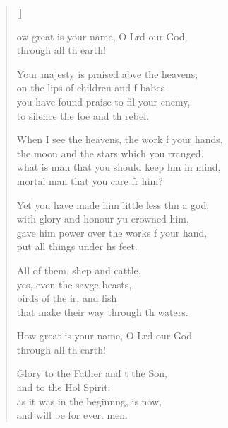 \settowidth{\versewidth}{When I see the heavens, the work of your hands, *}
\begin{verse}[\versewidth]
  \begin{patverse}

ow great is your name, O Lrd our God,\Med\\
through all th earth!

Your majesty is praised abve the heavens;\Med\\
on the lips of children and f babes\\
you have found praise to fil your enemy,\Med\\
to silence the foe and th rebel.

When I see the heavens, the work f your hands,\Med\\
the moon and the stars which you rranged,\\
what is man that you should keep h\pointup{\i}m in mind,\Med\\
mortal man that you care fr him?

Yet you have made him little less thn a god;\Med\\
with glory and honour yu crowned him,\\
gave him power over the works f your hand,\Med\\
put all things under h\pointup{\i}s feet.

All of them, shep and cattle,\Med\\
yes, even the savge beasts,\\
birds of the ir, and fish\Med\\
that make their way through th waters.

How great is your name, O Lrd our God\\
through all th earth!

Glory to the Father and t the Son,\Med\\
and to the Hol Spirit:\\
as it was in the beginn\pointup{\i}ng, is now,\Med\\
and will be for ever. men.
  \end{patverse}
  \end{verse}
